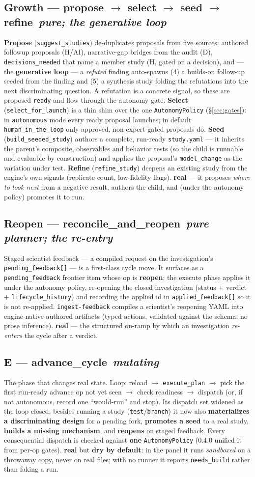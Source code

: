 \documentclass[11pt]{article}
\newcommand{\code}[1]{\texttt{\small #1}}
\newcommand{\real}{\textcolor{good}{\textbf{real}}}
\newcommand{\stage}[2]{\subsection*{\textcolor{accent}{#1}\, \normalfont\textit{\small #2}}}
\begin{document}
\stage{Growth --- propose $\rightarrow$ select $\rightarrow$ seed $\rightarrow$ refine}{pure; the generative loop}
\textbf{Propose} (\code{suggest\_studies}) de-duplicates proposals from five sources: authored
followup proposals (H/AI), narrative-gap bridges from the audit (D), \code{decisions\_needed}
that name a member study (H, gated on a decision), and --- the \textbf{generative loop} --- a
\emph{refuted} finding auto-spawns (4) a builds-on follow-up seeded from the finding and (5) a
synthesis study folding the refutations into the next discriminating question. A refutation is a
concrete signal, so these are proposed \code{ready} and flow through the autonomy gate.
\textbf{Select} (\code{select\_for\_launch}) is a thin shim over the one \code{AutonomyPolicy}
(\S\ref{sec:gates}): in \code{autonomous} mode every ready proposal launches; in default
\code{human\_in\_the\_loop} only approved, non-expert-gated proposals do. \textbf{Seed}
(\code{build\_seeded\_study}) authors a complete, run-ready \code{study.yaml} --- it inherits the
parent's composite, observables and behavior tests (so the child is runnable and evaluable by
construction) and applies the proposal's \code{model\_change} as the variation under test.
\textbf{Refine} (\code{refine\_study}) deepens an existing study from the engine's own signals
(replicate count, low-fidelity flags). \real{} --- it proposes \emph{where to look next} from a
negative result, authors the child, and (under the autonomy policy) promotes it to run.

\stage{Reopen --- reconcile\_and\_reopen}{pure planner; the re-entry}
Staged scientist feedback --- a compiled request on the investigation's \code{pending\_feedback[]}
--- is a first-class cycle move. It surfaces as a \code{pending\_feedback} frontier item whose op
is \textbf{reopen}; the execute phase applies it under the autonomy policy, re-opening the closed
investigation (status + verdict + \code{lifecycle\_history}) and recording the applied id in
\code{applied\_feedback[]} so it is not re-applied. \code{ingest-feedback} compiles a scientist's
reopening YAML into engine-native authored artifacts (typed actions, validated against the
schema; no prose inference). \real{} --- the structured on-ramp by which an investigation
\emph{re-enters} the cycle after a verdict.

\stage{E --- advance\_cycle}{mutating}
The phase that changes real state. Loop: reload $\rightarrow$ \code{execute\_plan} $\rightarrow$ pick
the first run-ready advance op not yet seen $\rightarrow$ check readiness $\rightarrow$ dispatch (or,
if not autonomous, record one ``would-run'' and stop). Its dispatch set widened as the loop closed:
besides running a study (\code{test}/\code{branch}) it now also \textbf{materializes a discriminating
design} for a pending fork, \textbf{promotes a seed} to a real study, \textbf{builds a missing
mechanism}, and \textbf{reopens} on staged feedback. Every consequential dispatch is checked against
\textbf{one} \code{AutonomyPolicy} (0.4.0 unified it from per-op gates). \real{} but \textbf{dry by
default}: in the panel it runs \emph{sandboxed} on a throwaway copy, never on real files; with no
runner it reports \code{needs\_build} rather than faking a run.
\end{document}
